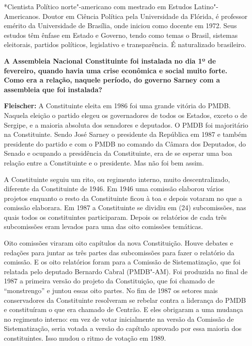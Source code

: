 *Cientista Político norte"-americano com mestrado em Estudos
Latino"-Americanos. Doutor em Ciência Política pela Universidade da
Flórida, é professor emérito da Universidade de Brasília, onde iniciou
como docente em 1972. Seus estudos têm ênfase em Estado e Governo, tendo
como temas o Brasil, sistemas eleitorais, partidos políticos,
legislativo e transparência. É naturalizado brasileiro.

\textbf{A Assembleia Nacional Constituinte foi instalada no dia 1º de
fevereiro, quando havia uma crise econômica e social muito forte. Como
era a relação, naquele período, do governo Sarney com a assembleia que
foi instalada?}

\textbf{Fleischer:} A Constituinte eleita em 1986 foi uma grande vitória
do PMDB. Naquela eleição o partido elegeu os governadores de todos os
Estados, exceto o de Sergipe, e a maioria absoluta dos senadores e
deputados. O PMDB foi majoritário na Constituinte. Sendo José Sarney o
presidente da República em 1987 e também presidente do partido e com o
PMDB no comando da Câmara dos Deputados, do Senado e ocupando a
presidência da Constituinte, era de se esperar uma boa relação entre a
Constituinte e o presidente. Mas não foi bem assim.

A Constituinte seguiu um rito, ou regimento interno, muito
descentralizado, diferente da Constituinte de 1946. Em 1946 uma comissão
elaborou vários projetos enquanto o resto da Constituinte ficou à toa e
depois votaram no que a comissão elaborara. Em 1987 a Constituinte se
dividiu em (24) subcomissões, nas quais todos os constituintes
participaram. Depois os relatórios de cada três subcomissões eram
levados para uma das oito comissões temáticas.

Oito comissões viraram oito capítulos da nova Constituição. Houve
debates e redações para juntar as três partes das subcomissões para
fazer o relatório da comissão. E os oito relatórios foram para a
Comissão de Sistematização, que foi relatada pelo deputado Bernardo
Cabral (PMDB"-AM). Foi produzida no final de 1987 a primeira versão do
projeto da Constituição, que foi chamado de ``monstrengo'' e juntou
essas oito partes. No fim de 1987 os setores mais conservadores da
Constituinte resolveram se rebelar contra a liderança do PMDB e
constituíram o que era chamado de Centrão. E eles obrigaram a uma
mudança no regimento interno: em vez de votar inicialmente na versão da
Comissão de Sistematização, seria votada a versão do capítulo aprovado
por essa maioria dos constituintes. Isso mudou o ritmo de votação em
1989.

